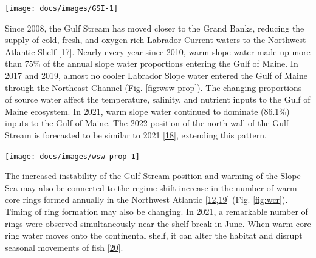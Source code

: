 \documentclass[
  10pt,
]{article}
\let\origfigure\figure
\let\endorigfigure\endfigure
\renewenvironment{figure}[1][2] {
    \expandafter\origfigure\expandafter[H]
} {
    \endorigfigure
}
\begin{document}
\begin{figure}

{\centering \texttt{[image: docs/images/GSI-1]} 

}

\caption{Index representing changes in the location of the Gulf Stream north wall. Positive values represent a more northerly Gulf Stream position.}\label{fig:GSI}
\end{figure}

Since 2008, the Gulf Stream has moved closer to the Grand Banks,
reducing the supply of cold, fresh, and oxygen-rich Labrador Current
waters to the Northwest Atlantic Shelf
{[}\protect\hyperlink{ref-goncalves_neto_changes_2021}{17}{]}. Nearly
every year since 2010, warm slope water made up more than 75\% of the
annual slope water proportions entering the Gulf of Maine. In 2017 and
2019, almost no cooler Labrador Slope water entered the Gulf of Maine
through the Northeast Channel (Fig. \ref{fig:wsw-prop}). The changing
proportions of source water affect the temperature, salinity, and
nutrient inputs to the Gulf of Maine ecosystem. In 2021, warm slope
water continued to dominate (86.1\%) inputs to the Gulf of Maine. The
2022 position of the north wall of the Gulf Stream is forecasted to be
similar to 2021
{[}\protect\hyperlink{ref-silver_forecasting_2021}{18}{]}, extending
this pattern.

\begin{figure}

{\centering \texttt{[image: docs/images/wsw-prop-1]} 

}

\caption{Proportion of Warm Slope Water (WSW) and Labrador Slope Water (LSLW) entering the Gulf of Maine through the Northeast Channel.}\label{fig:wsw-prop}
\end{figure}

The increased instability of the Gulf Stream position and warming of the
Slope Sea may also be connected to the regime shift increase in the
number of warm core rings formed annually in the Northwest Atlantic
{[}\protect\hyperlink{ref-gangopadhyay_census_2020}{12},\protect\hyperlink{ref-gangopadhyay_observed_2019}{19}{]}
(Fig. \ref{fig:wcr}). Timing of ring formation may also be changing. In
2021, a remarkable number of rings were observed simultaneously near the
shelf break in June. When warm core ring water moves onto the
continental shelf, it can alter the habitat and disrupt seasonal
movements of fish
{[}\protect\hyperlink{ref-gawarkiewicz_changing_2018}{20}{]}.
\end{document}
